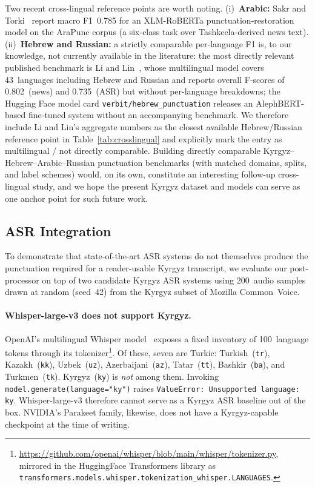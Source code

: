 \documentclass[manuscript, review]{acmart}
\begin{document}
Two recent cross-lingual reference points are worth noting. (i)~\textbf{Arabic:} Sakr and Torki~\cite{sakr2023arapunc} report macro F1~0.785 for an XLM-RoBERTa punctuation-restoration model on the AraPunc corpus (a six-class task over Tashkeela-derived news text). (ii)~\textbf{Hebrew and Russian:} a strictly comparable per-language F1 is, to our knowledge, not currently available in the literature: the most directly relevant published benchmark is Li and Lin~\cite{li2020multilingual}, whose multilingual model covers 43~languages including Hebrew and Russian and reports overall F-scores of 0.802~(news) and 0.735~(ASR) but without per-language breakdowns; the Hugging Face model card \texttt{verbit/hebrew\_punctuation} releases an AlephBERT-based fine-tuned system without an accompanying benchmark. We therefore include Li and Lin's aggregate numbers as the closest available Hebrew/Russian reference point in Table~\ref{tab:crosslingual} and explicitly mark the entry as multilingual / not directly comparable. Building directly comparable Kyrgyz--Hebrew--Arabic--Russian punctuation benchmarks (with matched domains, splits, and label schemes) would, on its own, constitute an interesting follow-up cross-lingual study, and we hope the present Kyrgyz dataset and models can serve as one anchor point for such future work.

\subsection{ASR Integration}
\label{sec:asr-integration}

To demonstrate that state-of-the-art ASR systems do not themselves produce the punctuation required for a reader-usable Kyrgyz transcript, we evaluate our post-processor on top of two candidate Kyrgyz ASR systems using 200~audio samples drawn at random (seed~42) from the Kyrgyz subset of Mozilla Common~Voice.

\paragraph{Whisper-large-v3 does not support Kyrgyz.} OpenAI's multilingual Whisper model~\cite{radford2023whisper} exposes a fixed inventory of 100~language tokens through its tokenizer\footnote{\url{https://github.com/openai/whisper/blob/main/whisper/tokenizer.py}, mirrored in the HuggingFace Transformers library as \texttt{transformers.models.whisper.tokenization\_whisper.LANGUAGES}.}. Of these, seven are Turkic: Turkish~(\texttt{tr}), Kazakh~(\texttt{kk}), Uzbek~(\texttt{uz}), Azerbaijani~(\texttt{az}), Tatar~(\texttt{tt}), Bashkir~(\texttt{ba}), and Turkmen~(\texttt{tk}). Kyrgyz~(\texttt{ky}) is \emph{not} among them. Invoking \texttt{model.generate(language="ky")} raises \texttt{ValueError: Unsupported language: ky}. Whisper-large-v3 therefore cannot serve as a Kyrgyz ASR baseline out of the box. NVIDIA's Parakeet family, likewise, does not have a Kyrgyz-capable checkpoint at the time of writing.
\end{document}
